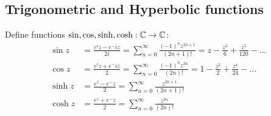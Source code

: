 \documentclass[a4paper]{article}
\begin{document}
\subsection{Trigonometric and Hyperbolic functions}
\begin{defi}
Define functions $\sin,\cos,\sinh,\cosh:\mathbb{C}\to\mathbb{C}$:
\begin{equation*}
\begin{aligned}
\sin z &= \frac{e^iz-e^-iz}{2i} = \sum_{n=0}^\infty \frac{\left(-1\right)^n z^{2n+1}}{\left(2n+1\right)!} = z-\frac{z^3}{6}+\frac{z^5}{120}-...\\
\cos z &= \frac{e^iz+e^-iz}{2} = \sum_{n=0}^\infty \frac{\left(-1\right)^n z^{2n}}{\left(2n\right)!} = 1-\frac{z^2}{2}+\frac{z^4}{24}-...\\
\sinh z &= \frac{e^z-e^-z}{2} = \sum_{n=0}^\infty \frac{z^{2n+1}}{\left(2n+1\right)!}\\
\cosh z &= \frac{e^z+e^-z}{2} = \sum_{n=0}^\infty \frac{z^{2n}}{\left(2n\right)!}
\end{aligned}
\end{equation*}
\end{defi}
\end{document}
